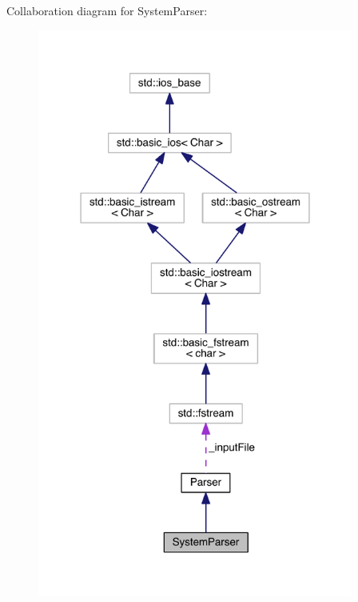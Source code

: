 Collaboration diagram for System\+Parser\+:\nopagebreak
\begin{figure}[H]
\begin{center}
\leavevmode
\includegraphics[width=294pt]{classSystemParser__coll__graph}
\end{center}
\end{figure}
